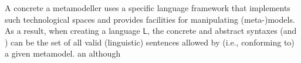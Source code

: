 A 
concrete 
% 
% 
a metamodeller uses a specific language framework that implements such 
technological spaces and provides facilities for manipulating (meta-)models. As 
a result, when creating a language $\mathsf{L}$, the concrete and abstract 
syntaxes (\CS and \AS) can be
the set of all valid (linguistic) sentences allowed by (i.e., conforming to) a 
given metamodel.
% 
an 
although 
% 
